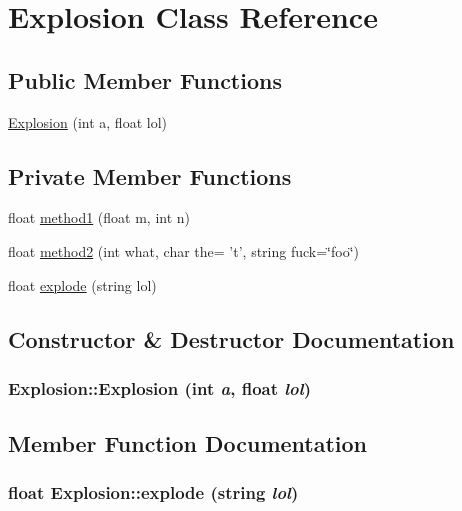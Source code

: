 \hypertarget{classExplosion}{
\section{Explosion Class Reference}
\label{classExplosion}
}
\subsection*{Public Member Functions}
\begin{CompactItemize}
\item 
\hyperlink{classExplosion_ef59aecd3c07f9dc07a55564ef829dbb}{Explosion} (int a, float lol)
\end{CompactItemize}
\subsection*{Private Member Functions}
\begin{CompactItemize}
\item 
float \hyperlink{classExplosion_13a5482f594ed43298471590cff1c9cb}{method1} (float m, int n)
\item 
float \hyperlink{classExplosion_dd9aefd63978127ed3c8a0265aa9c77b}{method2} (int what, char the= 't', string fuck=\char`\"{}foo\char`\"{})
\item 
float \hyperlink{classExplosion_d43019c9399b627c4e23ce83400b1e7c}{explode} (string lol)
\end{CompactItemize}


\subsection{Constructor \& Destructor Documentation}
\hypertarget{classExplosion_ef59aecd3c07f9dc07a55564ef829dbb}{
\subsubsection[{Explosion}]{\setlength{\rightskip}{0pt plus 5cm}Explosion::Explosion (int {\em a}, \/  float {\em lol})}}
\label{classExplosion_ef59aecd3c07f9dc07a55564ef829dbb}




\subsection{Member Function Documentation}
\hypertarget{classExplosion_d43019c9399b627c4e23ce83400b1e7c}{
\subsubsection[{explode}]{\setlength{\rightskip}{0pt plus 5cm}float Explosion::explode (string {\em lol})}}
\label{classExplosion_d43019c9399b627c4e23ce83400b1e7c}


